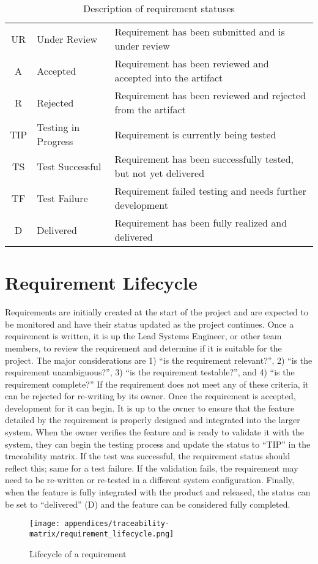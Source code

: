 \begin{table}
    \renewcommand{\arraystretch}{1.5}
    \centering
    \caption{Description of requirement statuses}
    \begin{tabular}{|c | p{} || p{}|}
        \hline
        UR  & Under Review          & Requirement has been submitted and is under review \\
        A   & Accepted              & Requirement has been reviewed and accepted into the artifact \\
        R   & Rejected              & Requirement has been reviewed and rejected from the artifact \\
        TIP & Testing in Progress   & Requirement is currently being tested \\
        TS  & Test Successful       & Requirement has been successfully tested, but not yet delivered \\
        TF  & Test Failure          & Requirement failed testing and needs further development \\
        D   & Delivered             & Requirement has been fully realized and delivered \\
        \hline
    \end{tabular}
\end{table}

\section{Requirement Lifecycle}
Requirements are initially created at the start of the project and are expected to be monitored and have their status updated as the project continues.
Once a requirement is written, it is up the Lead Systems Engineer, or other team members, to review the requirement and determine if it is suitable for the project.
The major considerations are 1) ``is the requirement relevant?'', 2) ``is the requirement unambiguous?'', 3) ``is the requirement testable?'', and 4) ``is the requirement complete?''
If the requirement does not meet any of these criteria, it can be rejected for re-writing by its owner.
Once the requirement is accepted, development for it can begin.
It is up to the owner to ensure that the feature detailed by the requirement is properly designed and integrated into the larger system.
When the owner verifies the feature and is ready to validate it with the system, they can begin the testing process and update the status to ``TIP'' in the traceability matrix.
If the test was successful, the requirement status should reflect this; same for a test failure.
If the validation fails, the requirement may need to be re-written or re-tested in a different system configuration.
Finally, when the feature is fully integrated with the product and released, the status can be set to ``delivered'' (D) and the feature can be considered fully completed.

\begin{figure}
    \centering
    \caption{Lifecycle of a requirement}
    \texttt{[image: appendices/traceability-matrix/requirement\_lifecycle.png]}
\end{figure}

